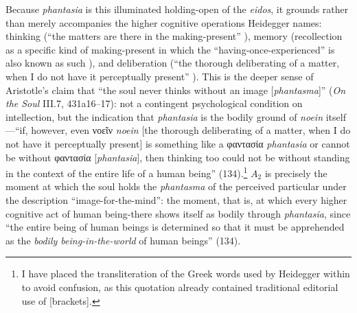 \documentclass{article}
\newcommand{\gk}[1]{{\greekfont #1}}
\begin{document}
Because \textit{phantasia} is this illuminated holding-open of the \textit{eidos}, it grounds rather than merely accompanies the higher cognitive operations Heidegger names: thinking (``the matters are there in the making-present'' ), memory (recollection as a specific kind of making-present in which the ``having-once-experienced'' is also known as such ), and deliberation (``the thorough deliberating of a matter, when I do not have it perceptually present'' ). This is the deeper sense of Aristotle's claim that ``the soul never thinks without an image [\textit{phantasma}]'' (\textit{On the Soul} III.7, 431a16–17): not a contingent psychological condition on intellection, but the indication that \textit{phantasia} is the bodily ground of \textit{noein} itself---``if, however, even \gk{νοεῖν} {\textit{noein}} [the thorough deliberating of a matter, when I do not have it perceptually present] is something like a \gk{φαντασία} {\textit{phantasia}} or cannot be without \gk{φαντασία} [\textit{phantasia}], then thinking too could not be without standing in the context of the entire life of a human being'' (134).\footnote{I have placed the transliteration of the Greek words used by Heidegger within {} to avoid confusion, as this quotation already contained traditional editorial use of [brackets].} $A_2$ is precisely the moment at which the soul holds the \textit{phantasma} of the perceived particular under the description ``image-for-the-mind'': the moment, that is, at which every higher cognitive act of human being-there shows itself as bodily through \textit{phantasia}, since ``the entire being of human beings is determined so that it must be apprehended as the \textit{bodily being-in-the-world} of human beings'' (134).
\end{document}
